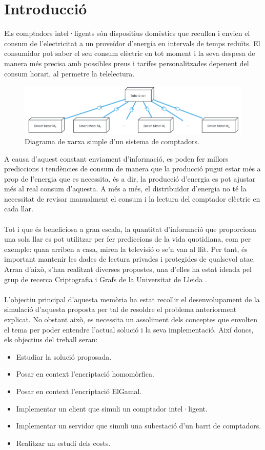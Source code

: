 \documentclass{article}
\begin{document}
\part{Introducció}
Els comptadors intel·ligents són dispositius domèstics que recullen i envien 
el consum de l'electricitat a un proveïdor d’energia en intervals de temps reduïts. El consumidor pot saber el seu consum elèctric en tot moment i la seva despesa de manera més precisa amb possibles preus i tarifes personalitzades depenent del consum horari, al permetre la telelectura.
\begin{figure}[H]
	\includegraphics[width=15cm]{umls/network.png}
	\caption{Diagrama de xarxa simple d'un sistema de comptadors.}
\end{figure}
A causa d'aquest constant enviament d'informació,
es poden fer millors prediccions i tendències de consum de manera que la producció pugui estar més a prop de l'energia que es necessita, és a dir, la producció d'energia es pot ajustar més al real consum d'aquesta. A més a més, el distribuïdor d'energia no té la necessitat de revisar manualment el consum i la lectura del comptador elèctric en cada llar.
\\
\\
Tot i que és beneficiosa a gran escala, la quantitat d'informació que proporciona una sola llar es pot utilitzar per fer prediccions de la vida quotidiana, com per exemple: quan arriben a casa, miren la televisió o se'n van al llit. Per tant, és important mantenir les dades de lectura privades i protegides de qualsevol atac. Arran d'això, s'han realitzat diverses propostes, una d'elles ha estat ideada pel grup de recerca Criptografia i Grafs de la Universitat de Lleida \cite{recsi}.
\\\\
L'objectiu principal d'aquesta memòria ha estat recollir el desenvolupament de la simulació d'aquesta proposta per tal de resoldre el problema anteriorment explicat. No obstant això, es necessita un assoliment dels conceptes que envolten el tema per poder entendre l'actual solució i la seva implementació. Així doncs, els objectius del treball seran:
\begin{itemize}
	\item Estudiar la solució proposada.
	\item Posar en context l'encriptació homomòrfica.
	\item Posar en context l'encriptació ElGamal.
	\item Implementar un client que simuli un comptador intel·ligent.
	\item Implementar un servidor que simuli una subestació d'un barri de comptadors.
	\item Realitzar un estudi dels costs.
\end{itemize}
\end{document}
